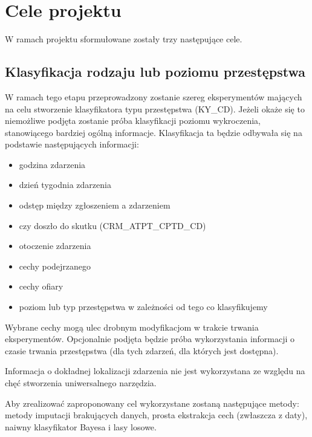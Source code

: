 \documentclass{classrep}
\begin{document}
    \section{Cele projektu} \label{project_goals} {
        W ramach projektu sformułowane zostały trzy następujące cele.

        \subsection{Klasyfikacja rodzaju lub poziomu przestępstwa}
        \label{project_goal_1} {

            W ramach tego etapu przeprowadzony zostanie szereg eksperymentów mających
            na celu stworzenie klasyfikatora typu przestępstwa (KY\_CD). Jeżeli okaże
            się to niemożliwe podjęta zostanie próba klasyfikacji poziomu wykroczenia,
            stanowiącego bardziej ogólną informacje. Klasyfikacja ta będzie odbywała
            się na podstawie następujących informacji:
            \begin{itemize}
                \item godzina zdarzenia
                \item dzień tygodnia zdarzenia
                \item odstęp między zgłoszeniem a zdarzeniem
                \item czy doszło do skutku (CRM\_ATPT\_CPTD\_CD)
                \item otoczenie zdarzenia
                \item cechy podejrzanego
                \item cechy ofiary
                \item poziom lub typ przestępstwa w zależności od tego co klasyfikujemy
            \end{itemize}

            Wybrane cechy mogą ulec drobnym modyfikacjom w trakcie trwania
            eksperymentów. Opcjonalnie podjęta będzie próba wykorzystania informacji o
            czasie trwania przestępstwa (dla tych zdarzeń, dla których jest dostępna).

            Informacja o dokładnej lokalizacji zdarzenia nie jest wykorzystana ze
            względu na chęć stworzenia uniwersalnego narzędzia.

            Aby zrealizować zaproponowany cel wykorzystane zostaną następujące metody:
            metody imputacji brakujących danych, prosta ekstrakcja cech (zwłaszcza z
            daty), naiwny klasyfikator Bayesa i lasy losowe.
        }

}
\end{document}
